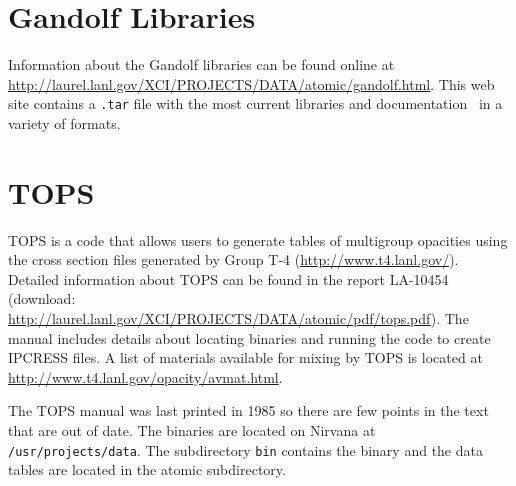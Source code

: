 \documentclass[11pt]{nmemo}
\begin{document}
\newpage

\section{Gandolf Libraries}

Information about the Gandolf libraries can be found online at
\url{http://laurel.lanl.gov/XCI/PROJECTS/DATA/atomic/gandolf.html}.
This web site contains a \texttt{.tar} file with the most current
libraries and documentation~\cite{gandolf} in a variety of formats.


\section{TOPS}

TOPS is a code that allows users to generate tables of multigroup
opacities using the cross section files generated by Group T-4
(\url{http://www.t4.lanl.gov/}).  Detailed information about TOPS can
be found in the report LA-10454~\cite{tops} (download:
\url{http://laurel.lanl.gov/XCI/PROJECTS/DATA/atomic/pdf/tops.pdf}).
The manual includes details about locating binaries and running the
code to create IPCRESS files.  A list of materials available for
mixing by TOPS is located at
\url{http://www.t4.lanl.gov/opacity/avmat.html}.

The TOPS manual was last printed in 1985 so there are few points in
the text that are out of date.  The binaries are located on Nirvana at
\texttt{/usr/projects/data}.  The subdirectory \texttt{bin} contains
the binary and the data tables are located in the atomic subdirectory.
\end{document}
